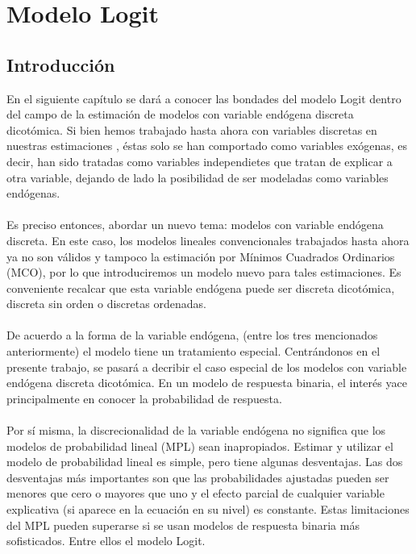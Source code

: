 \documentclass[11pt,fleqn]{book} %
\numberwithin{equation}{section} %
\numberwithin{figure}{section} %
\numberwithin{table}{section} %
\begin{document}
\section{Modelo Logit}

\subsection{Introducción}

En el siguiente capítulo se dará a conocer las bondades del modelo Logit dentro del campo de la estimación de modelos con variable endógena discreta dicotómica. Si bien hemos trabajado hasta ahora con variables discretas en nuestras estimaciones , éstas solo se han comportado como variables exógenas, es decir, han sido tratadas como variables independietes que tratan de explicar a otra variable, dejando de lado la posibilidad de ser modeladas como variables endógenas.
\\\\
Es preciso entonces, abordar un nuevo tema: modelos con variable endógena discreta. En este caso, los modelos lineales convencionales trabajados hasta ahora ya no son válidos y tampoco la estimación por Mínimos Cuadrados Ordinarios (MCO), por lo que introduciremos un modelo nuevo para tales estimaciones. Es conveniente recalcar que esta variable endógena puede ser discreta dicotómica, discreta sin orden o discretas ordenadas.
\\\\
De acuerdo a la forma de la variable endógena, (entre los tres mencionados anteriormente) el modelo tiene un tratamiento especial. Centrándonos en el presente trabajo, se pasará a decribir el caso especial de los modelos con variable endógena discreta dicotómica. En un modelo de respuesta binaria, el interés yace principalmente en conocer la probabilidad de respuesta.
\\\\
Por sí misma, la discrecionalidad de la variable endógena no significa que los modelos de probabilidad lineal (MPL)  sean inapropiados. Estimar y utilizar el modelo de probabilidad lineal es simple, pero tiene algunas desventajas. Las dos desventajas más importantes son que las probabilidades ajustadas pueden ser menores que cero o mayores que uno y el efecto parcial de cualquier variable explicativa (si aparece en la ecuación en su nivel) es constante. Estas limitaciones del MPL pueden superarse si se usan modelos de respuesta binaria más sofisticados. Entre ellos el modelo Logit.
\end{document}
